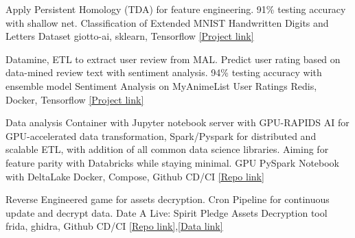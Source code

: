 \begin{cventries}

	\cventry
	{Apply Persistent Homology (TDA) for feature engineering. 91\% testing accuracy with shallow net.}
	{Classification of Extended MNIST Handwritten Digits and Letters Dataset}
	{giotto-ai, sklearn, Tensorflow}
	{\href{https://colab.research.google.com/drive/18z161k3diYO6sNVBfiKH8uGqbrekxMPN?usp=sharing}{[Project link]}}
	{}
	\vspace{-6mm}
	
	
	\cventry
	{Datamine, ETL to extract user review from MAL. Predict user rating based on data-mined review text with sentiment analysis. 94\% testing accuracy with ensemble model}
	{Sentiment Analysis on MyAnimeList User Ratings}
	{Redis, Docker, Tensorflow}
	{\href{https://github.com/n0k0m3/rnn-mal-sentiment}{[Project link]}}
	{}
	\vspace{-6mm}
	
	\cventry
	{Data analysis Container with Jupyter notebook server with GPU-RAPIDS AI for GPU-accelerated data transformation, Spark/Pyspark for distributed and scalable ETL, with addition of all common data science libraries. Aiming for feature parity with Databricks while staying minimal.}
	{GPU PySpark Notebook with DeltaLake}
	{Docker, Compose, Github CD/CI}
	{\href{https://github.com/n0k0m3/pyspark-notebook-deltalake-docker}{[Repo link]}}
	{}
	\vspace{-6mm}
	
	\cventry
	{Reverse Engineered game for assets decryption. Cron Pipeline for continuous update and decrypt data.}
	{Date A Live: Spirit Pledge Assets Decryption tool}
	{frida, ghidra, Github CD/CI}
	{\href{https://github.com/n0k0m3/DALSP-Assets-Decryption-tool}{[Repo link]},\href{https://github.com/n0k0m3/DateALiveData}{[Data link]}}
	{}
	\vspace{-10mm}
	
\end{cventries}